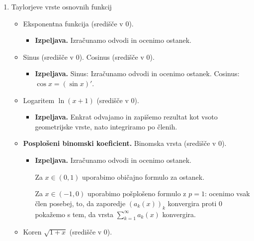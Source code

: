 \begin{enumerate}
\begin{itemize}
    \end{itemize}
    \item Taylorjeve vrste osnovnih funkcij
    \begin{itemize}
        \item Eksponentna funkcija (središče v $0$).
        \begin{itemize}
            \item \colorbox{green!30}{\textbf{Izpeljava.}} Izračunamo odvodi in ocenimo ostanek. 
        \end{itemize} 
        \item Sinus (središče v $0$). Cosinus (središče v $0$).
        \begin{itemize}
            \item \colorbox{green!30}{\textbf{Izpeljava.}} Sinus: Izračunamo odvodi in ocenimo ostanek.             
            Cosinus: $\cos x = (\sin x)'$.
        \end{itemize} 
        \item Logaritem $\ln (x+1)$ (središče v $0$).
        \begin{itemize}
            \item \colorbox{green!30}{\textbf{Izpeljava.}} Enkrat odvajamo in zapišemo rezultat kot vsoto geometrijske vrste, nato integriramo po členih.
        \end{itemize} 
        \item \textbf{Posplošeni binomski koeficient.} Binomska vrsta (središče v $0$). 
        \begin{itemize}
            \item \colorbox{green!30}{\textbf{Izpeljava.}} Izračunamo odvodi in ocenimo ostanek. 
            
            Za $x \in (0, 1)$ uporabimo običajno formulo za ostanek.

            Za $x \in (-1, 0)$ uporabimo pošplošeno formulo z $p = 1$: ocenimo vsak člen posebej, to, da zaporedje $(a_k(x))_k$ konvergira proti $0$ pokažemo s tem, da vrsta $\sum_{k=1}^{\infty}a_k(x)$ konvergira.
        \end{itemize} 
        \item Koren $\sqrt{1+x}$ (središče v $0$).
    \end{itemize}
\end{enumerate}